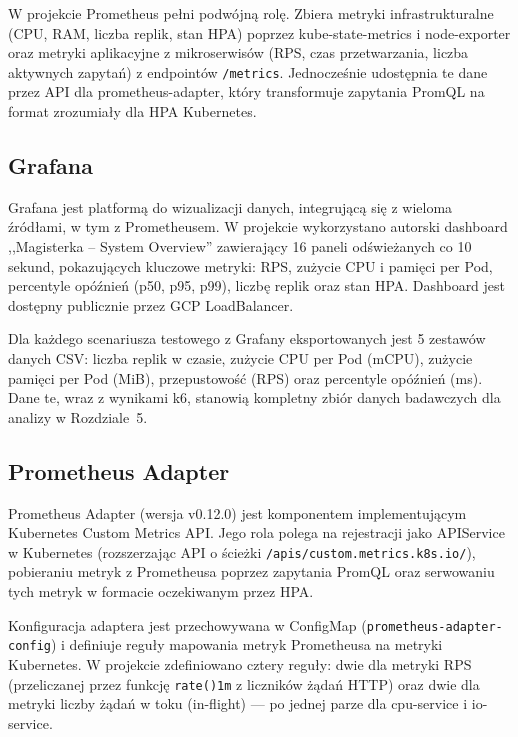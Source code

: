W projekcie Prometheus pełni podwójną rolę. Zbiera metryki infrastrukturalne (CPU, RAM, liczba replik, stan HPA) poprzez kube-state-metrics i node-exporter oraz metryki aplikacyjne z mikroserwisów (RPS, czas przetwarzania, liczba aktywnych zapytań) z endpointów \texttt{/metrics}. Jednocześnie udostępnia te dane przez API dla prometheus-adapter, który transformuje zapytania PromQL na format zrozumiały dla HPA Kubernetes.

\subsection{Grafana}

Grafana jest platformą do wizualizacji danych, integrującą się z wieloma źródłami, w tym z Prometheusem. W projekcie wykorzystano autorski dashboard ,,Magisterka -- System Overview'' zawierający 16 paneli odświeżanych co 10 sekund, pokazujących kluczowe metryki: RPS, zużycie CPU i pamięci per Pod, percentyle opóźnień (p50, p95, p99), liczbę replik oraz stan HPA. Dashboard jest dostępny publicznie przez GCP LoadBalancer.

Dla każdego scenariusza testowego z Grafany eksportowanych jest 5 zestawów danych CSV: liczba replik w czasie, zużycie CPU per Pod (mCPU), zużycie pamięci per Pod (MiB), przepustowość (RPS) oraz percentyle opóźnień (ms). Dane te, wraz z wynikami k6, stanowią kompletny zbiór danych badawczych dla analizy w Rozdziale~5.

\subsection{Prometheus Adapter}

Prometheus Adapter (wersja v0.12.0) jest komponentem implementującym Kubernetes Custom Metrics API. Jego rola polega na rejestracji jako APIService w Kubernetes (rozszerzając API o ścieżki \texttt{/apis/custom.metrics.k8s.io/}), pobieraniu metryk z Prometheusa poprzez zapytania PromQL oraz serwowaniu tych metryk w formacie oczekiwanym przez HPA.

Konfiguracja adaptera jest przechowywana w ConfigMap (\texttt{prometheus-adapter-config}) i definiuje reguły mapowania metryk Prometheusa na metryki Kubernetes. W projekcie zdefiniowano cztery reguły: dwie dla metryki RPS (przeliczanej przez funkcję \texttt{rate()\lbrack{}1m\rbrack{}} z liczników żądań HTTP) oraz dwie dla metryki liczby żądań w toku (in-flight) --- po jednej parze dla cpu-service i io-service.



